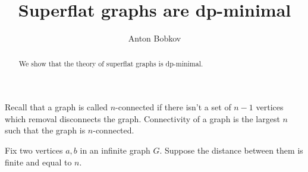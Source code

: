 \documentclass{amsart}
\begin{document}
\title{Superflat graphs are dp-minimal}
\author{Anton Bobkov}

\begin{abstract}
	We show that the theory of superflat graphs is dp-minimal.
\end{abstract}

\maketitle

Recall that a graph is called $n$-connected if there isn't a set of $n-1$ vertices which removal disconnects the graph. Connectivity of a graph is the largest $n$ such that the graph is $n$-connected.

\begin{Lemma}
	Fix two vertices $a,b$ in an infinite graph $G$. Suppose the distance between them is finite and equal to $n$. 
\end{Lemma}
\end{document}
